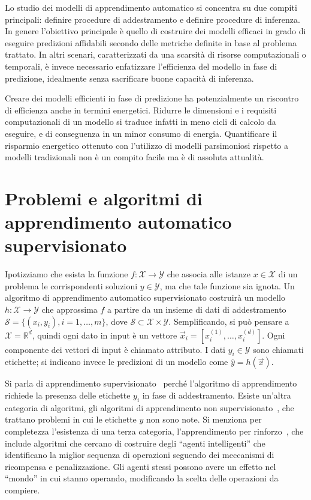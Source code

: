 Lo studio dei modelli di apprendimento automatico si concentra su due compiti principali: definire procedure di addestramento e definire procedure di inferenza. 
In genere l'obiettivo principale è quello di costruire dei modelli efficaci in grado di eseguire predizioni affidabili secondo delle metriche definite in base al problema trattato. 
In altri scenari, caratterizzati da una scarsità di risorse computazionali o temporali, è invece necessario enfatizzare l'efficienza del modello in fase di predizione, idealmente senza sacrificare buone capacità di inferenza.

Creare dei modelli efficienti in fase di predizione ha potenzialmente un riscontro di efficienza anche in termini energetici.
Ridurre le dimensioni e i requisiti computazionali di un modello si traduce infatti in meno cicli di calcolo da eseguire, e di conseguenza in un minor consumo di energia.
Quantificare il risparmio energetico ottenuto con l'utilizzo di modelli parsimoniosi rispetto a modelli tradizionali non è un compito facile ma è di assoluta attualità.

\section{Problemi e algoritmi di apprendimento automatico supervisionato}\label{sec:tipi_problemi_ml}
Ipotizziamo che esista la funzione $f:\mathcal{X}\rightarrow\mathcal{Y}$ che associa alle istanze $x \in \mathcal{X}$ di un problema le corrispondenti soluzioni $y \in \mathcal{Y}$, ma che tale funzione sia ignota. 
Un algoritmo di apprendimento automatico supervisionato costruirà un modello $h:\mathcal{X}\rightarrow\mathcal{Y}$ che approssima $f$ a partire da un insieme di dati di addestramento $\mathcal{S}=\{(x_i, y_i), i=1,\dots,m\}$, dove $\mathcal{S} \subset \mathcal{X} \times \mathcal{Y}$.
Semplificando, si può pensare a $\mathcal{X} = \mathbb{R}^d$, quindi ogni dato in input è un vettore $\Vec{x}_i=[x_i^{(1)},\dots,x_i^{(d)}]$.
Ogni componente dei vettori di input è chiamato attributo.
I dati $y_i \in \mathcal{Y}$ sono chiamati etichette; si indicano invece le predizioni di un modello come $\hat{y} = h(\Vec{x})$. 

Si parla di apprendimento supervisionato~\cite{elements-of-statistical-learning} perché l'algoritmo di apprendimento richiede la presenza delle etichette $y_i$ in fase di addestramento.
Esiste un'altra categoria di algoritmi, gli algoritmi di apprendimento non supervisionato~\cite{unsupervised_learning}, che trattano problemi in cui le etichette $y$ non sono note.
Si menziona per completezza l'esistenza di una terza categoria, l'apprendimento per rinforzo~\cite{reinforcement_learning}, che include algoritmi che cercano di costruire degli ``agenti intelligenti'' che identificano la miglior sequenza di operazioni seguendo dei meccanismi di ricompensa e penalizzazione. 
Gli agenti stessi possono avere un effetto nel ``mondo'' in cui stanno operando, modificando la scelta delle operazioni da compiere.

